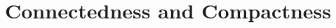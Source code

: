 \setcounter{chapter}{2} %
\chapter{Connectedness and Compactness}
\label{chap-connected-compact}
 

